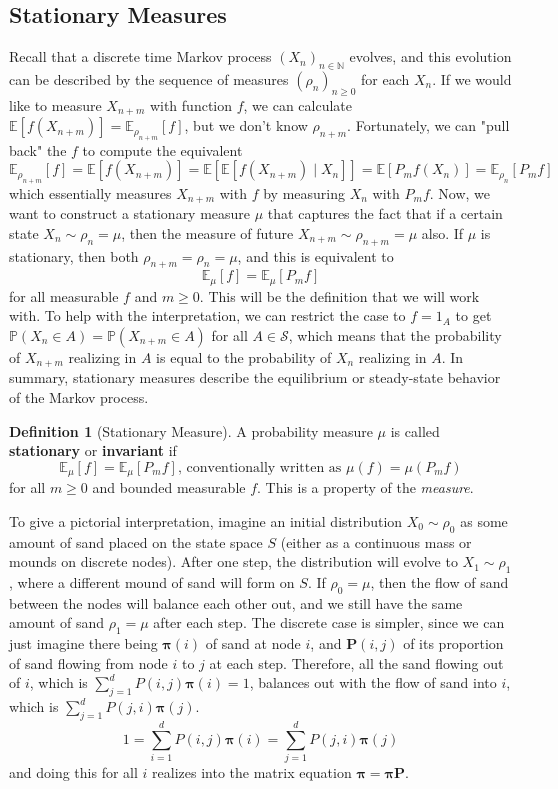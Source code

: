 \documentclass{article}
\theoremstyle{definition}
\theoremstyle{remark}
\theoremstyle{definition}
\newtheorem{definition}{Definition}[section]
\begin{document}
\subsection{Stationary Measures}

Recall that a discrete time Markov process $(X_n)_{n \in \mathbb{N}}$ evolves, and this evolution can be described by the sequence of measures $(\rho_n)_{n \geq 0}$ for each $X_n$. If we would like to measure $X_{n + m}$ with function $f$, we can calculate $\mathbb{E}[f(X_{n + m})] = \mathbb{E}_{\rho_{n + m}} [f]$, but we don't know $\rho_{n + m}$. Fortunately, we can "pull back" the $f$ to compute the equivalent 
\[\mathbb{E}_{\rho_{n + m}} [f] = \mathbb{E}[f(X_{n + m})] = \mathbb{E}[\mathbb{E}[ f(X_{n + m}) \mid X_n]] = \mathbb{E}[P_m f (X_n)] = \mathbb{E}_{\rho_{n}} [ P_m f] \]
which essentially measures $X_{n + m}$ with $f$ by measuring $X_n$ with $P_m f$. Now, we want to construct a stationary measure $\mu$ that captures the fact that if a certain state $X_n \sim \rho_n = \mu$, then the measure of future $X_{n + m} \sim \rho_{n + m} = \mu$ also. If $\mu$ is stationary, then both $\rho_{n + m} = \rho_n = \mu$, and this is equivalent to
\[\mathbb{E}_\mu [f] = \mathbb{E}_\mu [P_m f]\]
for all measurable $f$ and $m \geq 0$. This will be the definition that we will work with. To help with the interpretation, we can restrict the case to $f = 1_A$ to get $\mathbb{P}(X_n \in A) = \mathbb{P}(X_{n + m} \in A)$ for all $A \in \mathcal{S}$, which means that the probability of $X_{n + m}$ realizing in $A$ is equal to the probability of $X_n$ realizing in $A$. In summary, stationary measures describe the equilibrium or steady-state behavior of the Markov process.  

\begin{definition}[Stationary Measure]
A probability measure $\mu$ is called \textbf{stationary} or \textbf{invariant} if 
\[\mathbb{E}_\mu[f] = \mathbb{E}_\mu [P_m f] \text{, conventionally written as } \mu(f) = \mu(P_m f)\]
for all $m \geq 0$ and bounded measurable $f$. This is a property of the \textit{measure}. 
\end{definition}

To give a pictorial interpretation, imagine an initial distribution $X_0 \sim \rho_0$ as some amount of sand placed on the state space $S$ (either as a continuous mass or mounds on discrete nodes). After one step, the distribution will evolve to $X_1 \sim \rho_1$, where a different mound of sand will form on $S$. If $\rho_0 = \mu$, then the flow of sand between the nodes will balance each other out, and we still have the same amount of sand $\rho_1 = \mu$ after each step. The discrete case is simpler, since we can just imagine there being $\boldsymbol{\pi} (i)$ of sand at node $i$, and $\mathbf{P} (i, j)$ of its proportion of sand flowing from node $i$ to $j$ at each step. Therefore, all the sand flowing out of $i$, which is $\sum_{j=1}^d P(i, j) \boldsymbol{\pi}(i) = 1$, balances out with the flow of sand into $i$, which is $\sum_{j=1}^d P(j, i) \boldsymbol{\pi}(j)$. 
\[1 = \sum_{i=1}^d P(i, j) \boldsymbol{\pi}(i) = \sum_{j=1}^d P(j, i) \boldsymbol{\pi}(j)\]
and doing this for all $i$ realizes into the matrix equation $\boldsymbol{\pi} = \boldsymbol{\pi} \mathbf{P}$. 
\end{document}
